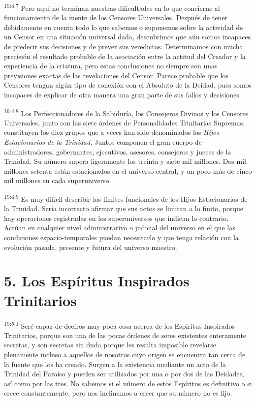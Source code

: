 \par
\textsuperscript{19:4.7} Pero aquí no terminan nuestras dificultades en lo que concierne al funcionamiento de la mente de los Censores Universales. Después de tener debidamente en cuenta todo lo que sabemos o suponemos sobre la actividad de un Censor en una situación universal dada, descubrimos que aún somos incapaces de predecir sus decisiones y de prever sus veredictos. Determinamos con mucha precisión el resultado probable de la asociación entre la actitud del Creador y la experiencia de la criatura, pero estas conclusiones no siempre son unas previsiones exactas de las revelaciones del Censor. Parece probable que los Censores tengan algún tipo de conexión con el Absoluto de la Deidad, pues somos incapaces de explicar de otra manera una gran parte de sus fallos y decisiones.

\par
\textsuperscript{19:4.8} Los Perfeccionadores de la Sabiduría, los Consejeros Divinos y los Censores Universales, junto con las siete órdenes de Personalidades Trinitarias Supremas, constituyen los diez grupos que a veces han sido denominados los \textit{Hijos Estacionarios de la Trinidad.} Juntos componen el gran cuerpo de administradores, gobernantes, ejecutivos, asesores, consejeros y jueces de la Trinidad. Su número supera ligeramente los treinta y siete mil millones. Dos mil millones setenta están estacionados en el universo central, y un poco más de cinco mil millones en cada superuniverso.

\par
\textsuperscript{19:4.9} Es muy difícil describir los límites funcionales de los Hijos Estacionarios de la Trinidad. Sería incorrecto afirmar que sus actos se limitan a lo finito, porque hay operaciones registradas en los superuniversos que indican lo contrario. Actúan en cualquier nivel administrativo o judicial del universo en el que las condiciones espacio-temporales puedan necesitarlo y que tenga relación con la evolución pasada, presente y futura del universo maestro.

\section*{5. Los Espíritus Inspirados Trinitarios}
\par
\textsuperscript{19:5.1} Seré capaz de deciros muy poca cosa acerca de los Espíritus Inspirados Trinitarios, porque son una de las pocas órdenes de seres existentes enteramente secretas, y son secretas sin duda porque les resulta imposible revelarse plenamente incluso a aquellos de nosotros cuyo origen se encuentra tan cerca de la fuente que los ha creado. Surgen a la existencia mediante un acto de la Trinidad del Paraíso y pueden ser utilizados por una o por dos de las Deidades, así como por las tres. No sabemos si el número de estos Espíritus es definitivo o si crece constantemente, pero nos inclinamos a creer que su número no es fijo.

